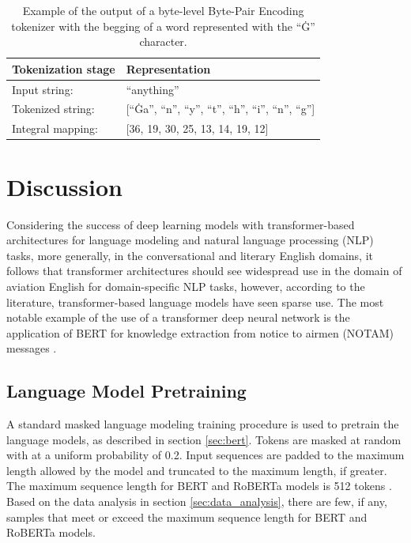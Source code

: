 \documentclass[12pt]{article}
\begin{document}
\begin{table}[h!]
    \centering
    \begin{tabular}{l l}
        \toprule
        Tokenization stage & Representation                                            \\
        \midrule
        Input string:      & ``anything''                                              \\
        Tokenized string:  & [``Ġa'', ``n'', ``y'', ``t'', ``h'', ``i'', ``n'', ``g''] \\
        Integral mapping:  & [36, 19, 30, 25, 13, 14, 19, 12]                          \\
        \bottomrule
    \end{tabular}
    \caption{Example of the output of a byte-level Byte-Pair Encoding tokenizer with the begging of a word represented with the ``Ġ'' character.}
    \label{tab:byte_level_bpe_example}
\end{table}

\section{Discussion}\label{sec:discussion}
Considering the success of deep learning models with transformer-based architectures for language modeling and natural language processing (NLP)
tasks, more generally, in the conversational and literary English domains, it follows that transformer architectures should see widespread use in the
domain of aviation English for domain-specific NLP tasks, however, according to the literature, transformer-based language models have seen sparse
use. The most notable example of the use of a transformer deep neural network is the application of BERT for knowledge extraction from notice to
airmen (NOTAM) messages \cite{arnold_knowledge_2022}.

\subsection{Language Model Pretraining}\label{sec:lm_pretraining}
A standard masked language modeling training procedure is used to pretrain the language models, as described in section \ref{sec:bert}. Tokens are
masked at random with at a uniform probability of 0.2. Input sequences are padded to the maximum length allowed by the model and truncated to the
maximum length, if greater. The maximum sequence length for BERT and RoBERTa models is 512 tokens \cite{devlin_bert_2019,liu_roberta_2019}. Based on
the data analysis in section \ref{sec:data_analysis}, there are few, if any, samples that meet or exceed the maximum sequence length for BERT and
RoBERTa models.
\end{document}
